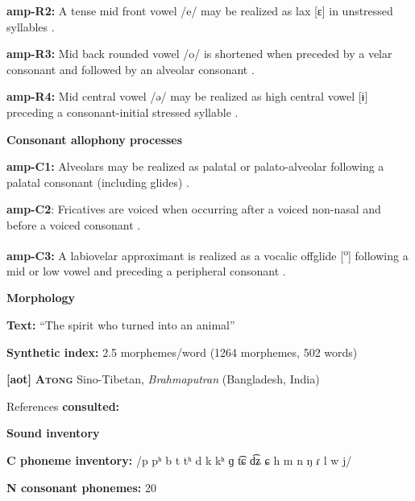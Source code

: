 \textbf{amp-R2:} A tense mid front vowel /e/ may be realized as lax [ɛ] in unstressed syllables \citep[38]{Bruce1984}.



\textbf{amp-R3:} Mid back rounded vowel /o/ is shortened when preceded by a velar consonant and followed by an alveolar consonant \citep[39]{Bruce1984}.



\textbf{amp-R4:} Mid central vowel /ə/ may be realized as high central vowel [ɨ] preceding a consonant-initial stressed syllable \citep[41]{Bruce1984}.



\textbf{Consonant allophony processes}



\textbf{amp-C1:} Alveolars may be realized as palatal or palato-alveolar following a palatal consonant (including glides) \citep[29]{Bruce1984}.



\textbf{amp-C2}: Fricatives are voiced when occurring after a voiced non-nasal and before a voiced consonant \citep[25]{Bruce1984}.



\textbf{amp-C3:} A labiovelar approximant is realized as a vocalic offglide [\textsuperscript{o}] following a mid or low vowel and preceding a peripheral consonant \citep[28]{Bruce1984}.



\textbf{Morphology}



\textbf{Text:} “The spirit who turned into an animal” \citep[323-331]{Bruce1984}



\textbf{Synthetic index:} 2.5 morphemes/word (1264 morphemes, 502 words)



\textbf{[aot]}   \textbf{\textsc{Atong}  }  Sino-Tibetan, \textit{Brahmaputran} (Bangladesh, India)



References \textbf{consulted:}  \citet{VanBreugel2008}



\textbf{Sound inventory}



\textbf{C phoneme inventory:} /p pʰ b t tʰ d k kʰ ɡ t͡ɕ d͡ʑ ɕ h m n ŋ ɾ l w j/



\textbf{N consonant phonemes:} 20



